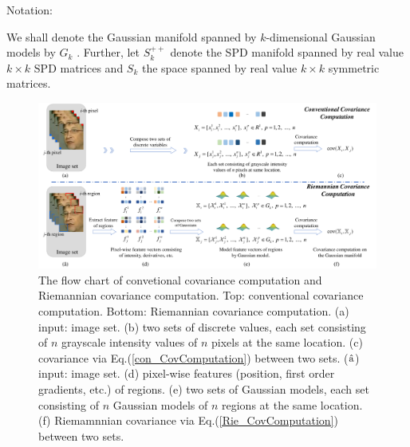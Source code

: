 \documentclass[review]{elsarticle}
\begin{document}
 \begin{bfseries} Notation: \end{bfseries} We shall denote the Gaussian manifold spanned by $k$-dimensional Gaussian models by $G_k$ . Further, let $S_k^{++}$ denote the SPD manifold spanned by real value ${k \times k}$ SPD matrices and  $S_k$ the space spanned by real value ${k \times k}$ symmetric matrices. 
\begin{figure}
\begin{center}
\includegraphics[width=0.99\linewidth]{Fig1.pdf} 
\end{center}
   \caption{ The flow chart of convetional covariance computation and Riemannian covariance computation. Top: conventional covariance computation. Bottom: Riemannian covariance computation. (a) input: image set. (b) two sets of discrete values, each set consisting of $n$ grayscale intensity values of $n$ pixels at the same location. (c) covariance via {Eq.(\ref{con_CovComputation})} between two sets. ($\hat{{\rm a}}$) input: image set. (d) pixel-wise features (position, first order gradients, etc.) of regions. (e) two sets of Gaussian models, each set consisting of $n$ Gaussian models of $n$ regions at the same location. (f) Riemamnnian covariance via {Eq.(\ref{Rie_CovComputation})} between two sets.}
\label{fig:short}
\end{figure}
\end{document}
